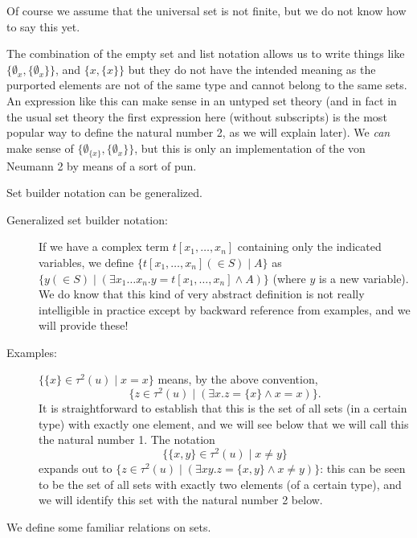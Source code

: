\documentclass[12pt]{book}
\begin{document}
Of course we assume that the universal set is not finite, but we do
not know how to say this yet.

The combination of the empty set and list notation allows us to write
things like $\{\emptyset_x,\{\emptyset_x\}\}$, and
$\{x,\{x\}\}$ but they do not have the intended meaning as the purported elements are not of the same type and cannot belong to the same sets.   An expression like this can make sense in an
untyped set theory (and in fact in the usual set theory the first
expression here (without subscripts) is the most popular way to define the natural number 2, as we
will explain later).  We {\em can\/} make sense of $\{\emptyset_{\{x\}},\{\emptyset_x\}\}$, but this is only an implementation of the von Neumann 2 by means of a sort of pun.

Set builder notation can be generalized.  

\begin{description}

\item[Generalized set builder notation:] If we have a complex term
$t[x_1,\ldots,x_n]$ containing only the indicated variables, we define
$\{t[x_1,\ldots,x_n] (\in S) \mid A\}$ as $\{y (\in S) \mid (\exists x_1\ldots
x_n.y=t[x_1,\ldots,x_n] \wedge A)\}$ (where $y$ is a new variable).
We do know that this kind of very abstract definition is not really
intelligible in practice except by backward reference from examples,
and we will provide these!

\item[Examples:] $\{\{x\}\in \tau^2(u) \mid x=x\}$ means, by the above convention,
$$\{z \in \tau^2(u)\mid (\exists x.z=\{x\}\wedge x=x)\}.$$  It is straightforward to
establish that this is the set of all sets (in a certain type) with exactly one element,
and we will see below that we will call this the natural number 1.
The notation $$\{\{x,y\}\in \tau^2(u)\mid x \neq y\}$$ expands out to $\{z\in \tau^2(u)  \mid
(\exists xy.z = \{x,y\} \wedge x\neq y)\}$: this can be seen to be the
set of all sets with exactly two elements (of a certain type), and we will identify this
set with the natural number 2 below.

\end{description}


We define some familiar relations on sets.
\end{document}
